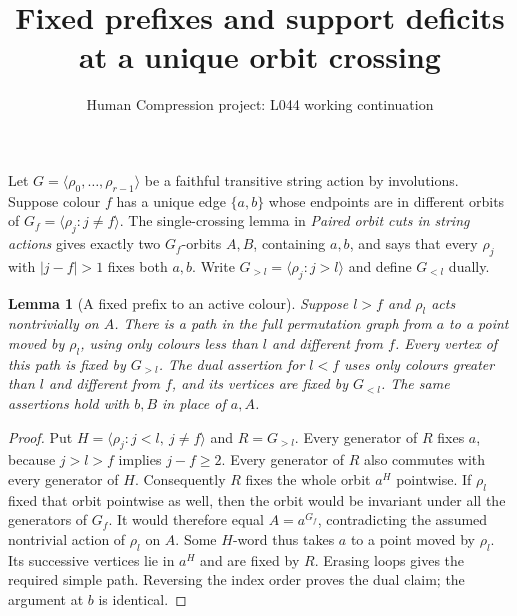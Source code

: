\documentclass[11pt,a4paper]{article}
\title{Fixed prefixes and support deficits at a unique orbit crossing}
\author{Human Compression project: L044 working continuation}
\date{}
\newtheorem{lemma}{Lemma}
\newcommand{\gen}[1]{\langle#1\rangle}
\begin{document}
\maketitle
Let $G=\gen{\rho_0,\ldots,\rho_{r-1}}$ be a faithful transitive
string action by involutions. Suppose colour $f$ has a unique edge
$\{a,b\}$ whose endpoints are in different orbits of
$G_f=\gen{\rho_j:j\ne f}$. The single-crossing lemma in
\emph{Paired orbit cuts in string actions} gives exactly two
$G_f$-orbits $A,B$, containing $a,b$, and says that every
$\rho_j$ with $|j-f|>1$ fixes both $a,b$. Write
$G_{>l}=\gen{\rho_j:j>l}$ and define $G_{<l}$ dually.

\begin{lemma}[A fixed prefix to an active colour]\label{prefix}
Suppose $l>f$ and $\rho_l$ acts nontrivially on $A$. There is a
path in the full permutation graph from $a$ to a point moved by
$\rho_l$, using only colours less than $l$ and different from $f$.
Every vertex of this path is fixed by $G_{>l}$.
The dual assertion for $l<f$ uses only colours greater than $l$
and different from $f$, and its vertices are fixed by $G_{<l}$.
The same assertions hold with $b,B$ in place of $a,A$.
\end{lemma}
\begin{proof}
Put $H=\gen{\rho_j:j<l,\ j\ne f}$ and $R=G_{>l}$.
Every generator of $R$ fixes $a$, because $j>l>f$ implies
$j-f\ge2$. Every generator of $R$ also commutes with every
generator of $H$. Consequently $R$ fixes the whole orbit $a^H$
pointwise. If $\rho_l$ fixed that orbit pointwise as well, then
the orbit would be invariant under all the generators of $G_f$.
It would therefore equal $A=a^{G_f}$, contradicting the assumed
nontrivial action of $\rho_l$ on $A$. Some $H$-word thus takes
$a$ to a point moved by $\rho_l$. Its successive vertices lie
in $a^H$ and are fixed by $R$. Erasing loops gives the required
simple path. Reversing the index order proves the dual claim;
the argument at $b$ is identical.
\end{proof}
\end{document}
